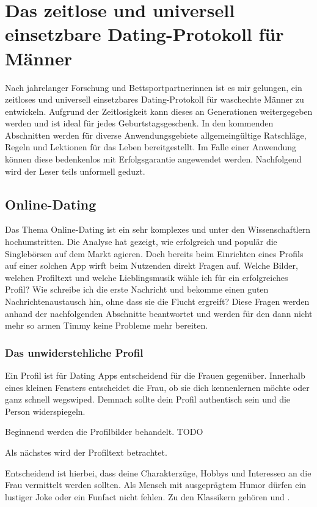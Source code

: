 \chapter{Das zeitlose und universell einsetzbare Dating-Protokoll für Männer}
\label{chapter-protokoll}

Nach jahrelanger Forschung und Bettsportpartnerinnen ist es mir gelungen, ein zeitloses und universell einsetzbares Dating-Protokoll für waschechte Männer zu entwickeln.
Aufgrund der Zeitlosigkeit kann dieses an Generationen weitergegeben werden und ist ideal für jedes Geburtstagsgeschenk.
In den kommenden Abschnitten werden für diverse Anwendungsgebiete allgemeingültige Ratschläge, Regeln und Lektionen für das Leben bereitgestellt. 
Im Falle einer Anwendung können diese bedenkenlos mit Erfolgsgarantie angewendet werden.
Nachfolgend wird der Leser teils unformell geduzt.


\section{Online-Dating}

Das Thema Online-Dating ist ein sehr komplexes und unter den Wissenschaftlern hochumstritten.
Die Analyse hat gezeigt, wie erfolgreich und populär die Singlebörsen auf dem Markt agieren.
Doch bereits beim Einrichten eines Profils auf einer solchen App wirft beim Nutzenden direkt Fragen auf. 
Welche Bilder, welchen Profiltext und welche Lieblingsmusik wähle ich für ein erfolgreiches Profil?
Wie schreibe ich die erste Nachricht und bekomme einen guten Nachrichtenaustausch hin, ohne dass sie die Flucht ergreift?
Diese Fragen werden anhand der nachfolgenden Abschnitte beantwortet und werden für den dann nicht mehr so armen Timmy keine Probleme mehr bereiten.


\subsection{Das unwiderstehliche Profil}

Ein Profil ist für Dating Apps entscheidend für die Frauen gegenüber.
Innerhalb eines kleinen Fensters entscheidet die Frau, ob sie dich kennenlernen möchte oder ganz schnell wegswiped.
Demnach sollte dein Profil authentisch sein und die Person widerspiegeln.

Beginnend werden die Profilbilder behandelt.
TODO

Als nächstes wird der Profiltext betrachtet. 

Entscheidend ist hierbei, dass deine Charakterzüge, Hobbys und Interessen an die Frau vermittelt werden sollten.
Als Mensch mit ausgeprägtem Humor dürfen ein lustiger Joke oder ein Funfact nicht fehlen.
Zu den Klassikern gehören \glqq \grqq und \glqq \grqq.

